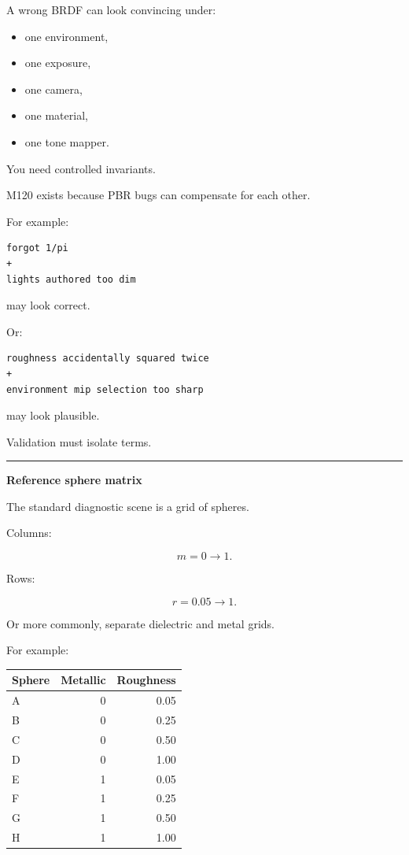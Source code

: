 A wrong BRDF can look convincing under:

\begin{itemize}
\tightlist
\item
  one environment,
\item
  one exposure,
\item
  one camera,
\item
  one material,
\item
  one tone mapper.
\end{itemize}

You need controlled invariants.

M120 exists because PBR bugs can compensate for each other.

For example:

\begin{verbatim}
forgot 1/pi
+
lights authored too dim
\end{verbatim}

may look correct.

Or:

\begin{verbatim}
roughness accidentally squared twice
+
environment mip selection too sharp
\end{verbatim}

may look plausible.

Validation must isolate terms.

\begin{center}\rule{0.5\linewidth}{0.5pt}\end{center}

\textbf{Reference sphere matrix}

The standard diagnostic scene is a grid of spheres.

Columns:

\[
m=0\rightarrow1.
\]

Rows:

\[
r=0.05\rightarrow1.
\]

Or more commonly, separate dielectric and metal grids.

For example:

{\def\LTcaptype{none} %
\begin{longtable}[]{@{}lrr@{}}
\toprule\noalign{}
Sphere & Metallic & Roughness \\
\midrule\noalign{}
\endhead
\bottomrule\noalign{}
\endlastfoot
A & 0 & 0.05 \\
B & 0 & 0.25 \\
C & 0 & 0.50 \\
D & 0 & 1.00 \\
E & 1 & 0.05 \\
F & 1 & 0.25 \\
G & 1 & 0.50 \\
H & 1 & 1.00 \\
\end{longtable}
}

